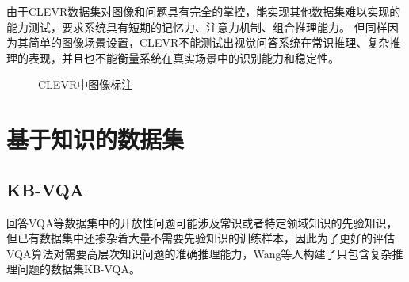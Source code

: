 由于CLEVR数据集对图像和问题具有完全的掌控，能实现其他数据集难以实现的能力测试，要求系统具有短期的记忆力、注意力机制、组合推理能力。
但同样因为其简单的图像场景设置，CLEVR不能测试出视觉问答系统在常识推理、复杂推理的表现，并且也不能衡量系统在真实场景中的识别能力和稳定性。
\begin{figure}[H]
	\centering
	\caption{CLEVR中图像标注}
	\label{clevr}
\end{figure}



\section{基于知识的数据集}
\subsection{KB-VQA}
回答VQA等数据集中的开放性问题可能涉及常识或者特定领域知识的先验知识，但已有数据集中还掺杂着大量不需要先验知识的训练样本，因此为了更好的评估VQA算法对需要高层次知识问题的准确推理能力，Wang等人构建了只包含复杂推理问题的数据集KB-VQA。

